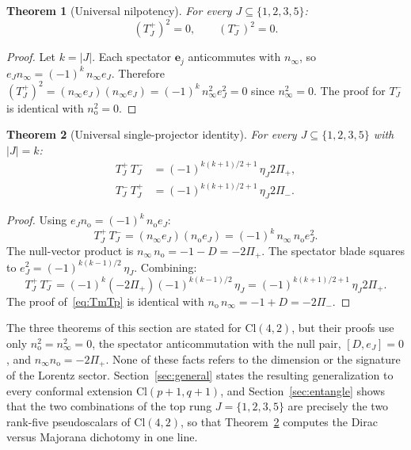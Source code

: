 \documentclass{birkjour}
\newtheorem{thm}{Theorem}[section]
\theoremstyle{definition}
\theoremstyle{remark}
\numberwithin{equation}{section}
\newcommand{\Cl}{\mathrm{Cl}}
\newcommand{\e}[1]{\bm{e}_{#1}}
\newcommand{\no}{n_{\mathrm{o}}}
\newcommand{\ninf}{n_{\infty}}
\newenvironment{revblock}{}{}
\begin{document}
\begin{thm}[Universal nilpotency]\label{thm:nilpotent}
For every $J\subseteq\{1,2,3,5\}$:
\begin{equation}\label{eq:nil}
(T^+_J)^2=0,\qquad (T^-_J)^2=0.
\end{equation}
\end{thm}

\begin{proof}
Let $k=|J|$.
Each spectator $\e{j}$ anticommutes with $\ninf$, so
$e_J \ninf=(-1)^k\,\ninf e_J$.
Therefore
$(T^+_J)^2=(\ninf  e_J)(\ninf  e_J)
=(-1)^k\,\ninf^2  e_J^2=0$
since $\ninf^2=0$.
The proof for $T^-_J$ is identical with $\no^2=0$.
\end{proof}

\begin{thm}[Universal single-projector identity]
\label{thm:projector}
For every $J\subseteq\{1,2,3,5\}$ with $|J|=k$:
\begin{align}
T^+_J\,T^-_J
&= (-1)^{k(k+1)/2+1}\,\eta_J  2\Pi_+,
\label{eq:TpTm}\\
T^-_J\,T^+_J
&= (-1)^{k(k+1)/2+1}\,\eta_J  2\Pi_-.
\label{eq:TmTp}
\end{align}
\end{thm}

\begin{proof}
Using $e_J \no=(-1)^k\,\no e_J$:
\begin{equation}
T^+_J\,T^-_J
=(\ninf  e_J)(\no  e_J)
=(-1)^k\,\ninf\,\no e_J^2.
\end{equation}
The null-vector product is
$\ninf\,\no=-1-D=-2\Pi_+$.
The spectator blade squares to
$e_J^2=(-1)^{k(k-1)/2}\,\eta_J$.
Combining:
\begin{equation}
T^+_J\,T^-_J
=(-1)^k (-2\Pi_+) (-1)^{k(k-1)/2}\,\eta_J
=(-1)^{k(k+1)/2+1}\,\eta_J  2\Pi_+.
\end{equation}
The proof of~\eqref{eq:TmTp} is identical with
$\no\,\ninf=-1+D=-2\Pi_-$.
\end{proof}

\begin{revblock}
The three theorems of this section are stated for $\Cl(4,2)$,
but their proofs use only $\no^2=\ninf^2=0$, the spectator
anticommutation with the null pair, $[D,e_J]=0$, and
$\ninf\no=-2\Pi_+$. None of these facts refers to the dimension
or the signature of the Lorentz sector. Section~\ref{sec:general}
states the resulting generalization to every conformal extension
$\Cl(p+1,q+1)$, and Section~\ref{sec:entangle} shows that the two
combinations of the top rung $J=\{1,2,3,5\}$ are precisely the two
rank-five pseudoscalars of $\Cl(4,2)$, so that
Theorem~\ref{thm:projector} computes the Dirac versus Majorana
dichotomy in one line.
\end{revblock}
\end{document}
